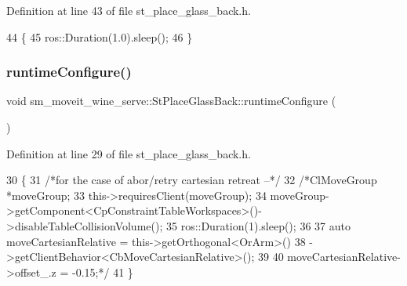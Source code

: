 Definition at line 43 of file st\+\_\+place\+\_\+glass\+\_\+back.\+h.


\begin{DoxyCode}
44         \{
45             ros::Duration(1.0).sleep();
46         \}
\end{DoxyCode}
\mbox{\label{structsm__moveit__wine__serve_1_1StPlaceGlassBack_a98016cd6d5f302b6ccc2f71a1b7c2f18}} 
\subsubsection{\texorpdfstring{runtime\+Configure()}{runtimeConfigure()}}
{\footnotesize\ttfamily void sm\+\_\+moveit\+\_\+wine\+\_\+serve\+::\+St\+Place\+Glass\+Back\+::runtime\+Configure (\begin{DoxyParamCaption}{ }\end{DoxyParamCaption})\hspace{0.3cm}{\ttfamily [inline]}}



Definition at line 29 of file st\+\_\+place\+\_\+glass\+\_\+back.\+h.


\begin{DoxyCode}
30         \{
31             \textcolor{comment}{/*for the case of abor/retry cartesian retreat --*/}
32             \textcolor{comment}{/*ClMoveGroup *moveGroup;}
33 \textcolor{comment}{            this->requiresClient(moveGroup);}
34 \textcolor{comment}{            moveGroup->getComponent<CpConstraintTableWorkspaces>()->disableTableCollisionVolume();}
35 \textcolor{comment}{            ros::Duration(1).sleep();}
36 \textcolor{comment}{}
37 \textcolor{comment}{            auto moveCartesianRelative = this->getOrthogonal<OrArm>()}
38 \textcolor{comment}{                                             ->getClientBehavior<CbMoveCartesianRelative>();}
39 \textcolor{comment}{}
40 \textcolor{comment}{            moveCartesianRelative->offset\_.z = -0.15;*/}
41         \}
\end{DoxyCode}
\mbox{\label{structsm__moveit__wine__serve_1_1StPlaceGlassBack_a2a2c4ea167f240ae46b8cd7eeda02783}} 
